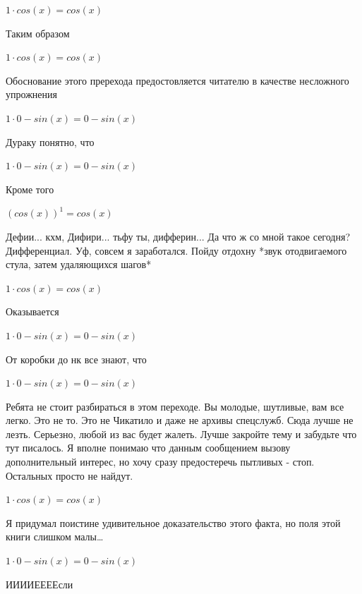 \documentclass[12pt,a4paper,fleqn]{article}
\begin{document}
\begin{center}
$1 \cdot cos(x) = cos(x)$\end{center}
Таким образом

\begin{center}
$1 \cdot cos(x) = cos(x)$\end{center}
Обоснование этого пререхода предостовляется читателю в качестве несложного упрожнения

\begin{center}
$1 \cdot 0-sin(x) = 0-sin(x)$\end{center}
Дураку понятно, что

\begin{center}
$1 \cdot 0-sin(x) = 0-sin(x)$\end{center}
Кроме того

\begin{center}
$(cos(x))^{1} = cos(x)$\end{center}
Дефии... кхм, Дифири... тьфу ты, дифферин... Да что ж со мной такое сегодня? Дифференциал. Уф, совсем я заработался. Пойду отдохну *звук отодвигаемого стула, затем удаляющихся шагов*

\begin{center}
$1 \cdot cos(x) = cos(x)$\end{center}
Оказывается

\begin{center}
$1 \cdot 0-sin(x) = 0-sin(x)$\end{center}
От коробки до нк все знают, что

\begin{center}
$1 \cdot 0-sin(x) = 0-sin(x)$\end{center}
Ребята не стоит разбираться в этом переходе. Вы молодые, шутливые, вам все легко. Это не то. Это не Чикатило и даже не архивы спецслужб. Сюда лучше не лезть. Серьезно, любой из вас будет жалеть. Лучше закройте тему и забудьте что тут писалось. Я вполне понимаю что данным сообщением вызову дополнительный интерес, но хочу сразу предостеречь пытливых - стоп. Остальных просто не найдут.

\begin{center}
$1 \cdot cos(x) = cos(x)$\end{center}
Я придумал поистине удивительное доказательство этого факта, но поля этой книги слишком малы\ldots

\begin{center}
$1 \cdot 0-sin(x) = 0-sin(x)$\end{center}
ИИИИЕЕЕЕсли\cite{link3}
\end{document}
